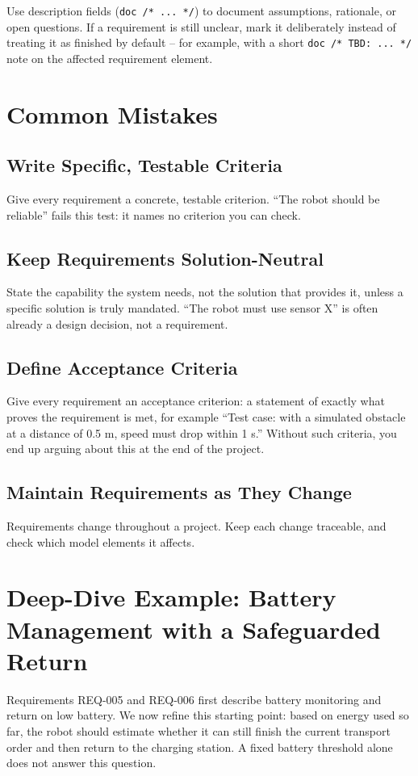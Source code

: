 Use description fields (\texttt{doc /* ... */}) to document assumptions, rationale, or open questions. If a requirement is still unclear, mark it deliberately instead of treating it as finished by default -- for example, with a short \texttt{doc /* TBD: ... */} note on the affected requirement element.

\section{Common Mistakes}
\subsection{Write Specific, Testable Criteria}
Give every requirement a concrete, testable criterion. \enquote{The robot should be reliable} fails this test: it names no criterion you can check.

\subsection{Keep Requirements Solution-Neutral}
State the capability the system needs, not the solution that provides it, unless a specific solution is truly mandated. \enquote{The robot must use sensor X} is often already a design decision, not a requirement.

\subsection{Define Acceptance Criteria}
Give every requirement an acceptance criterion: a statement of exactly what proves the requirement is met, for example \enquote{Test case: with a simulated obstacle at a distance of 0.5 m, speed must drop within 1 s.} Without such criteria, you end up arguing about this at the end of the project.

\subsection{Maintain Requirements as They Change}
Requirements change throughout a project. Keep each change traceable, and check which model elements it affects.

\section{Deep-Dive Example: Battery Management with a Safeguarded Return}
\label{sec:bm-anforderungen}
Requirements REQ-005 and REQ-006 first describe battery monitoring and return on low battery. We now refine this starting point: based on energy used so far, the robot should estimate whether it can still finish the current transport order and then return to the charging station. A fixed battery threshold alone does not answer this question.


